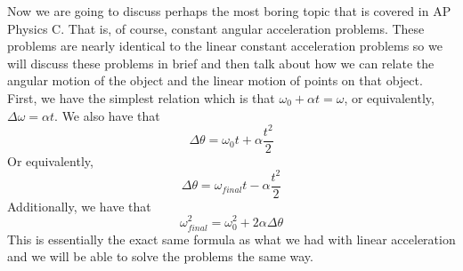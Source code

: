 
Now we are going to discuss perhaps the most boring topic that is covered in AP Physics C. That is, of course, constant angular acceleration problems. These problems are nearly identical to the linear constant acceleration problems so we will discuss these problems in brief and then talk about how we can relate the angular motion of the object and the linear motion of points on that object. First, we have the simplest relation which is that $\omega_0+\alpha t=\omega$, or equivalently, $\Delta \omega=\alpha t$. We also have that \begin{equation}\Delta \theta=\omega_0 t+\alpha \frac{t^2}{2}\end{equation} Or equivalently, \begin{equation}\Delta \theta=\omega_{final}t-\alpha \frac{t^2}{2}\end{equation} Additionally, we have that \begin{equation}\omega_{final}^2 = \omega_{0}^2+2\alpha \Delta \theta\end{equation} This is essentially the exact same formula as what we had with linear acceleration and we will be able to solve the problems the same way. 

